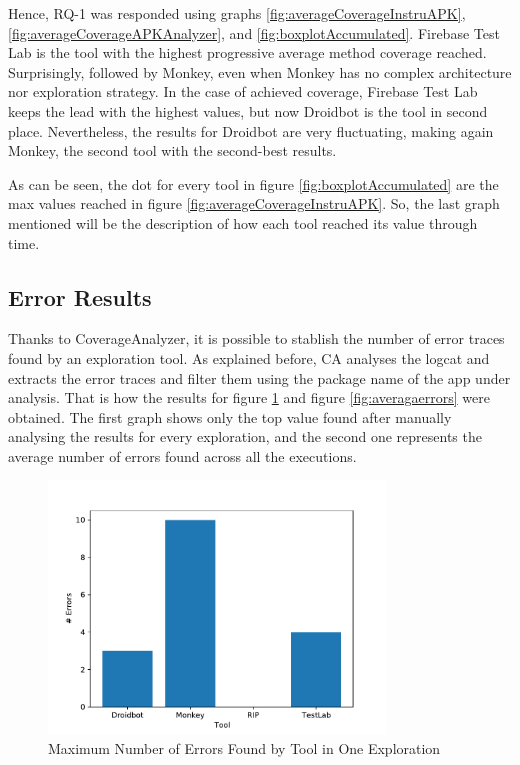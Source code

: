 Hence, RQ-1 was responded using graphs \ref{fig:averageCoverageInstruAPK}, \ref{fig:averageCoverageAPKAnalyzer}, and \ref{fig:boxplotAccumulated}. Firebase Test Lab is the tool with the highest progressive average method coverage reached. Surprisingly, followed by Monkey, even when Monkey has no complex architecture nor exploration strategy. In the case of achieved coverage, Firebase Test Lab keeps the lead with the highest values, but now Droidbot is the tool in second place. Nevertheless, the results for Droidbot are very fluctuating, making again Monkey, the second tool with the second-best results. 

As can be seen, the dot for every tool in figure \ref{fig:boxplotAccumulated} are the max values reached in figure \ref{fig:averageCoverageInstruAPK}. So, the last graph mentioned will be the description of how each tool reached its value through time.

\subsection{Error Results}\label{sec:errorResults}

Thanks to CoverageAnalyzer, it is possible to stablish the number of error traces found by an exploration tool. As explained before, CA analyses the logcat and extracts the error traces and filter them using the package name of the app under analysis. That is how the results for 
figure \ref{fig:maxerrors} and figure \ref{fig:averagaerrors} were obtained. The first graph shows only the top value found after manually analysing the results for every exploration, and the second one represents the average number of errors found across all the executions. 

\begin{figure}[h]
\centering
\includegraphics[width=0.8\textwidth]{../Figures/maxErrors.pdf}
\caption{Maximum Number of Errors Found by Tool in One Exploration}\label{fig:maxerrors}
\end{figure}

